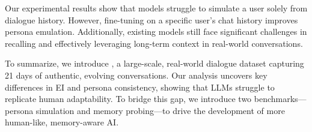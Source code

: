 Our experimental results show that models struggle to simulate a user solely from dialogue history. 
However, fine-tuning on a specific user’s chat history improves persona emulation. 
Additionally, existing models still face significant challenges in recalling and effectively leveraging long-term context in real-world conversations.

To summarize, we introduce \dataset{}, a large-scale, real-world dialogue dataset capturing 21 days of authentic, evolving conversations.  
Our analysis uncovers key differences in EI and persona consistency, showing that LLMs struggle to replicate human adaptability.
To bridge this gap, we introduce two benchmarks—persona simulation and memory probing—to drive the development of more human-like, memory-aware AI.  










